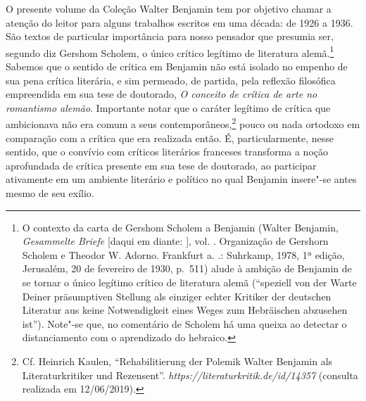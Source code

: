 O presente volume da Coleção Walter Benjamin tem por objetivo chamar a
atenção do leitor para alguns trabalhos escritos em uma década: de 1926
a 1936. São textos de particular importância para nosso pensador que
presumia ser, segundo diz Gershom Scholem, o único crítico legítimo de
literatura alemã.\footnote{O contexto da carta de Gershom Scholem a
  Benjamin (Walter Benjamin, \emph{Gesammelte Briefe} [daqui em diante: ], vol. . Organização de Gershorn
  Scholem e Theodor W. Adorno. Frankfurt a. .: Suhrkamp, 1978, 1ª edição, Jerusalém, 20 de fevereiro de 1930, p.~511) alude à ambição de
  Benjamin de se tornar o único legítimo crítico de literatura alemã
  (``speziell von der Warte Deiner präsumptiven Stellung als einziger
      echter Kritiker der deutschen Literatur aus keine Notwendigkeit eines
      Weges zum Hebräischen abzusehen ist''). Note"-se que, no comentário de
  Scholem há uma queixa ao detectar o distanciamento com o aprendizado
  do hebraico.} Sabemos que o sentido de crítica em Benjamin não está
isolado no empenho de sua pena crítica literária, e sim permeado, de
partida, pela reflexão filosófica empreendida em sua tese de doutorado,
\emph{O conceito de crítica de arte no romantismo alemão}. Importante
notar que o caráter legítimo de crítica que ambicionava não era comum a
seus contemporâneos,\footnote{Cf. Heinrich Kaulen, ``Rehabilitierung der
  Polemik Walter Benjamin als Literaturkritiker und Rezensent''.
  \emph{https://literaturkritik.de/id/14357} (consulta realizada em
  12/06/2019).} pouco ou nada ortodoxo em comparação com a crítica que
era realizada então. É, particularmente, nesse sentido, que o convívio
com críticos literários franceses transforma a noção aprofundada de
crítica presente em sua tese de doutorado, ao participar ativamente em
um ambiente literário e político no qual Benjamin insere"-se antes mesmo
de seu exílio.

